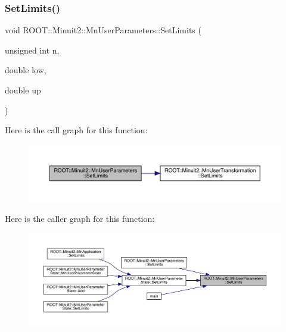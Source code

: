 \subsubsection{\texorpdfstring{SetLimits()}{SetLimits()}\hspace{0.1cm}{\footnotesize\ttfamily [3/6]}}
{\footnotesize\ttfamily void R\+O\+O\+T\+::\+Minuit2\+::\+Mn\+User\+Parameters\+::\+Set\+Limits (\begin{DoxyParamCaption}\item[{unsigned int}]{n,  }\item[{double}]{low,  }\item[{double}]{up }\end{DoxyParamCaption})}

Here is the call graph for this function\+:
\nopagebreak
\begin{figure}[H]
\begin{center}
\leavevmode
\includegraphics[width=350pt]{d6/d10/classROOT_1_1Minuit2_1_1MnUserParameters_afa56296f97716c90cfbdd3f81d5caffc_cgraph}
\end{center}
\end{figure}
Here is the caller graph for this function\+:
\nopagebreak
\begin{figure}[H]
\begin{center}
\leavevmode
\includegraphics[width=350pt]{d6/d10/classROOT_1_1Minuit2_1_1MnUserParameters_afa56296f97716c90cfbdd3f81d5caffc_icgraph}
\end{center}
\end{figure}
\mbox{\label{classROOT_1_1Minuit2_1_1MnUserParameters_a3b22d430f97df8789a8890497c57eed4}} 
